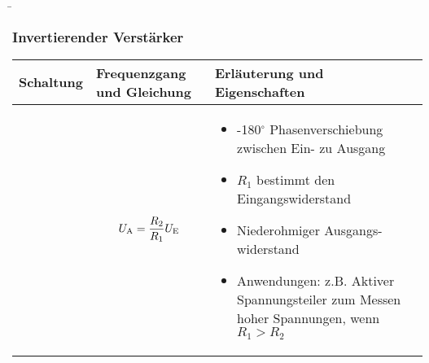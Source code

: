\begin{frame}
    \b{
    \frametitle{Invertierender Verstärker}
    \centering
    \begin{table}[ht]
    \label{tab:InvertierenderVerstaerker}
    \begin{tabular}{|m{}|m{}|m{}|}
    \hline
    Schaltung & Frequenzgang und Gleichung & Erläuterung und Eigenschaften\\ %
    \hline
    \vspace{0.5cm}
    \centering
    
     & 
    \begin{center}
        
\end{center}
\vspace{1ex}
\[
    U_{\textnormal{A}} = \frac{R_2}{R_1} U_{\textnormal{E}}
\]
    &
\begin{itemize}
    \item -180$^\circ$ Phasenverschiebung zwischen Ein- zu Ausgang
    \item $R_1$ bestimmt den Eingangswiderstand
    \item Niederohmiger Ausgangs-\linebreak widerstand
    \item Anwendungen: \linebreak z.B. Aktiver Spannungsteiler zum Messen hoher Spannungen, wenn $R_1 > R_2$
\end{itemize} \\
    \hline
    \end{tabular}
    \end{table}
    }
\end{frame}

